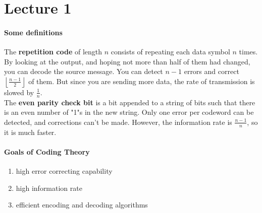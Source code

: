 \documentclass[10pt,letter]{article}
\theoremstyle{plain}
\theoremstyle{definition}
\begin{document}
\section*{Lecture 1}
\paragraph{Some definitions}
The \textbf{repetition code} of length $n$ consists of repeating each data symbol $n$ times. By looking at the output, and hoping not more than half of them had changed, you can decode the source message. You can detect $n-1$ errors and correct $\left\lfloor\frac{n-1}{2}\right\rfloor$ of them. But since you are sending more data, the rate of transmission is slowed by $\frac{1}{n}$. \\
The \textbf{even parity check bit} is a bit appended to a string of bits such that there is an even number of "1"s in the new string. Only one error per codeword can be detected, and corrections can't be made. However, the information rate is $\frac{n-1}{n}$, so it is much faster. 

\paragraph{Goals of Coding Theory}
\begin{enumerate}
    \item high error correcting capability
    \item high information rate 
    \item efficient encoding and decoding algorithms
\end{enumerate}
\end{document}
